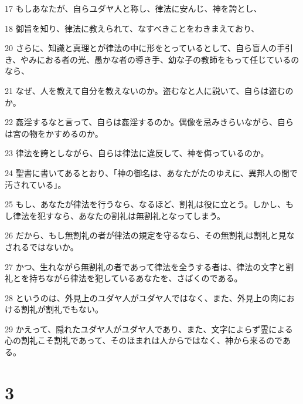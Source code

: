 \par 17 もしあなたが、自らユダヤ人と称し、律法に安んじ、神を誇とし、
\par 18 御旨を知り、律法に教えられて、なすべきことをわきまえており、
\par 20 さらに、知識と真理とが律法の中に形をとっているとして、自ら盲人の手引き、やみにおる者の光、愚かな者の導き手、幼な子の教師をもって任じているのなら、
\par 21 なぜ、人を教えて自分を教えないのか。盗むなと人に説いて、自らは盗むのか。
\par 22 姦淫するなと言って、自らは姦淫するのか。偶像を忌みきらいながら、自らは宮の物をかすめるのか。
\par 23 律法を誇としながら、自らは律法に違反して、神を侮っているのか。
\par 24 聖書に書いてあるとおり、「神の御名は、あなたがたのゆえに、異邦人の間で汚されている」。
\par 25 もし、あなたが律法を行うなら、なるほど、割礼は役に立とう。しかし、もし律法を犯すなら、あなたの割礼は無割礼となってしまう。
\par 26 だから、もし無割礼の者が律法の規定を守るなら、その無割礼は割礼と見なされるではないか。
\par 27 かつ、生れながら無割礼の者であって律法を全うする者は、律法の文字と割礼とを持ちながら律法を犯しているあなたを、さばくのである。
\par 28 というのは、外見上のユダヤ人がユダヤ人ではなく、また、外見上の肉における割礼が割礼でもない。
\par 29 かえって、隠れたユダヤ人がユダヤ人であり、また、文字によらず霊による心の割礼こそ割礼であって、そのほまれは人からではなく、神から来るのである。

\chapter{3}

